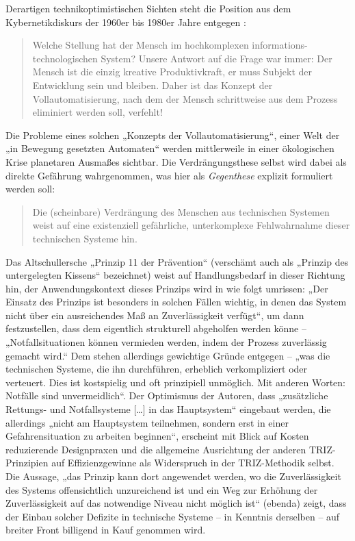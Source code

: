 \documentclass[11pt,a4paper]{article}
\begin{document}
Derartigen technikoptimistischen Sichten steht die Position aus dem
Kybernetikdiskurs der 1960er bis 1980er Jahre entgegen \cite[S. 10]{KFK2000}:
\begin{quote}
  Welche Stellung hat der Mensch im hochkomplexen informations-technologischen
  System? Unsere Antwort auf die Frage war immer: Der Mensch ist die einzig
  kreative Produktivkraft, er muss Subjekt der Entwicklung sein und bleiben.
  Daher ist das Konzept der Vollautomatisierung, nach dem der Mensch
  schrittweise aus dem Prozess eliminiert werden soll, verfehlt!
\end{quote}
Die Probleme eines solchen „Konzepts der Vollautomatisierung“, einer Welt der
„in Bewegung gesetzten Automaten“ werden mittlerweile in einer ökologischen
Krise planetaren Ausmaßes sichtbar. Die Verdrängungsthese selbst wird dabei
als direkte Gefährung wahrgenommen, was hier als \emph{Gegenthese} explizit
formuliert werden soll:
\begin{quote}
  Die (scheinbare) Verdrängung des Menschen aus technischen Systemen weist auf
  eine existenziell gefährliche, unterkomplexe Fehlwahrnahme dieser
  technischen Systeme hin.
\end{quote}
Das Altschullersche „Prinzip 11 der Prävention“ (verschämt auch als „Prinzip
des untergelegten Kissens“ bezeichnet) weist auf Handlungsbedarf in dieser
Richtung hin, der Anwendungskontext dieses Prinzips wird in \cite{TT} wie
folgt umrissen: „Der Einsatz des Prinzips ist besonders in solchen Fällen
wichtig, in denen das System nicht über ein ausreichendes Maß an
Zuverlässigkeit verfügt“, um dann festzustellen, dass dem eigentlich
strukturell abgeholfen werden könne -- „Notfallsituationen können vermieden
werden, indem der Prozess zuverlässig gemacht wird.“ Dem stehen allerdings
gewichtige Gründe entgegen -- „was die technischen Systeme, die ihn
durchführen, erheblich verkompliziert oder verteuert. Dies ist kostspielig und
oft prinzipiell unmöglich. Mit anderen Worten: Notfälle sind unvermeidlich“.
Der Optimismus der Autoren, dass „zusätzliche Rettungs- und Notfallsysteme
[\ldots] in das Hauptsystem“ eingebaut werden, die allerdings „nicht am
Hauptsystem teilnehmen, sondern erst in einer Gefahrensituation zu arbeiten
beginnen“, erscheint mit Blick auf Kosten reduzierende Designpraxen und die
allgemeine Ausrichtung der anderen TRIZ-Prinzipien auf Effizienzgewinne als
Widerspruch in der TRIZ-Methodik selbst. Die Aussage, „das Prinzip kann dort
angewendet werden, wo die Zuverlässigkeit des Systems offensichtlich
unzureichend ist und ein Weg zur Erhöhung der Zuverlässigkeit auf das
notwendige Niveau nicht möglich ist“ (ebenda) zeigt, dass der Einbau solcher
Defizite in technische Systeme -- in Kenntnis derselben -- auf breiter Front
billigend in Kauf genommen wird.
\end{document}
